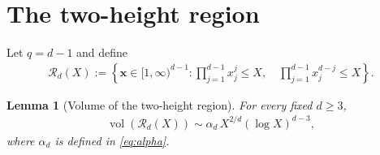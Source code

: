 \documentclass[12pt,a4paper,reqno]{amsart}
\numberwithin{equation}{section}
\newcommand{\cR}{\mathcal R}
\newcommand{\1}{\mathbf 1}
\DeclareMathOperator{\vol}{vol}
\theoremstyle{plain}
\newtheorem{lemma}[theorem]{Lemma}
\theoremstyle{definition}
\begin{document}
\section{The two-height region}

Let $q=d-1$ and define
\begin{align}
 \cR_d(X):=\left\{\boldsymbol x\in[1,\infty)^{d-1}:
 \prod_{j=1}^{d-1}x_j^j\leq X,
 \quad
 \prod_{j=1}^{d-1}x_j^{d-j}\leq X
 \right\}.\label{eq:defineRd}
\end{align}

\begin{lemma}[Volume of the two-height region]\label{lem:volume}
For every fixed $d\geq3$,
\begin{align}
 \vol(\cR_d(X))
 \sim\alpha_d\, X^{2/d}(\log X)^{d-3},
\label{eq:volumeasymp}
\end{align}
where $\alpha_d$ is defined in \eqref{eq:alpha}.
\end{lemma}
\end{document}
